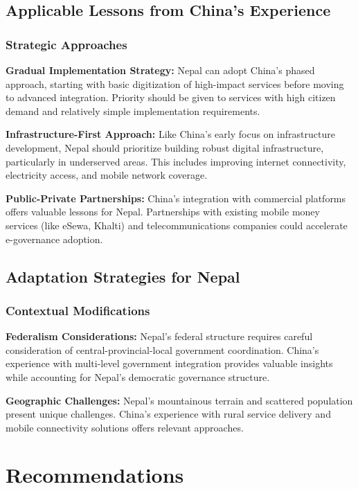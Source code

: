 \documentclass[12pt,a4paper]{article}
\begin{document}
\subsection{Applicable Lessons from China's Experience}

\subsubsection{Strategic Approaches}

\textbf{Gradual Implementation Strategy:}
Nepal can adopt China's phased approach, starting with basic digitization of high-impact services before moving to advanced integration. Priority should be given to services with high citizen demand and relatively simple implementation requirements.

\textbf{Infrastructure-First Approach:}
Like China's early focus on infrastructure development, Nepal should prioritize building robust digital infrastructure, particularly in underserved areas. This includes improving internet connectivity, electricity access, and mobile network coverage.

\textbf{Public-Private Partnerships:}
China's integration with commercial platforms offers valuable lessons for Nepal. Partnerships with existing mobile money services (like eSewa, Khalti) and telecommunications companies could accelerate e-governance adoption.

\subsection{Adaptation Strategies for Nepal}

\subsubsection{Contextual Modifications}

\textbf{Federalism Considerations:}
Nepal's federal structure requires careful consideration of central-provincial-local government coordination. China's experience with multi-level government integration provides valuable insights while accounting for Nepal's democratic governance structure.

\textbf{Geographic Challenges:}
Nepal's mountainous terrain and scattered population present unique challenges. China's experience with rural service delivery and mobile connectivity solutions offers relevant approaches.

\section{Recommendations}
\end{document}
